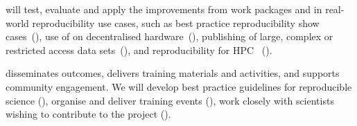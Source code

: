      will test, evaluate and apply the improvements from
    work packages  and  in real-world
    reproducibility use cases, such as best practice reproducibility show
    cases~(), use of \repotodocker{} on
    decentralised hardware~(), publishing
    of large, complex or restricted access data
    sets~(), and reproducibility for HPC~
    ().

     disseminates outcomes, delivers training materials
    and activities, and supports community engagement. We will develop best practice guidelines for reproducible
    science (), organise and deliver
    training events (), work closely with
    scientists wishing to contribute to the project ().

%
%
%
%
%
%

